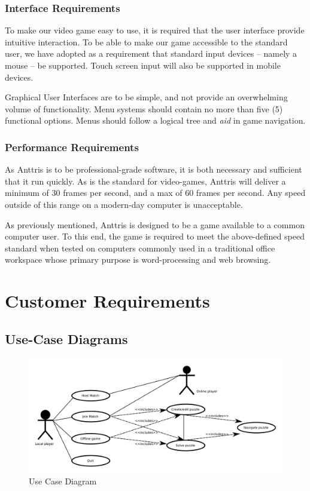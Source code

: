 \documentclass[12pt]{article}
\begin{document}
\subsubsection{Interface Requirements}
To make our video game easy to use, it is required that the user interface
provide intuitive interaction. To be able to make our game accessible to
the standard user, we have adopted as a requirement that standard
input devices -- namely a mouse -- be supported. Touch screen input will
also be supported in mobile devices.

Graphical User Interfaces are to be simple, and not provide an overwhelming
volume of functionality. Menu systems should contain no more than five (5)
functional options. Menus should follow a logical tree and \textsl{aid} in
game navigation.
\subsubsection{Performance Requirements}
As Anttris is to be professional-grade software, it is both necessary and
sufficient that it run quickly. As is the standard for video-games, Anttris
will deliver a minimum of 30 frames per second, and a max of 60 frames per
second. Any speed outside of this range on a modern-day computer is
unacceptable.

As previously mentioned, Anttris is designed to be a game available to a common
computer user. To this end, the game is required to meet the above-defined
speed standard when tested on computers commonly used in a traditional office
workspace whose primary purpose is word-processing and web browsing.

\section{Customer Requirements}\label{cust-reqs-HR}
\subsection{Use-Case Diagrams}
    \begin{figure}[H]
        \centering
        \includegraphics[width=6in]{use_cases.png}
        \caption{Use Case Diagram}
    \end{figure}
\end{document}
